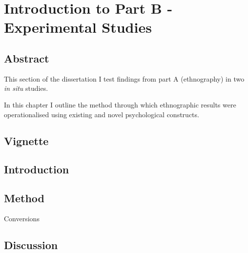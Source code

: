 \chapter{\label{partBintroMethod}Introduction to Part B - Experimental Studies}


  \minitoc


\section{Abstract}

This section of the dissertation I test findings from part A (ethnography) in two \textit{in situ} studies.

In this chapter I outline the method through which ethnographic results were operationalised using existing and novel psychological constructs.  

\section{Vignette}



\section{Introduction}



\section{Method}

Conversions


\section{Discussion}
